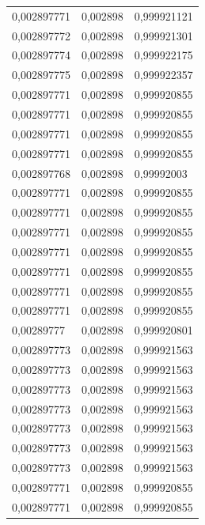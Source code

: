\begin{center}
\begin{longtable}{|l|l|l|}
0,002897771        & 0,002898              & 0,999921121  \\
0,002897772        & 0,002898              & 0,999921301  \\
0,002897774        & 0,002898              & 0,999922175  \\
0,002897775        & 0,002898              & 0,999922357  \\
0,002897771        & 0,002898              & 0,999920855  \\
0,002897771        & 0,002898              & 0,999920855  \\
0,002897771        & 0,002898              & 0,999920855  \\
0,002897771        & 0,002898              & 0,999920855  \\
0,002897768        & 0,002898              & 0,99992003   \\
0,002897771        & 0,002898              & 0,999920855  \\
0,002897771        & 0,002898              & 0,999920855  \\
0,002897771        & 0,002898              & 0,999920855  \\
0,002897771        & 0,002898              & 0,999920855  \\
0,002897771        & 0,002898              & 0,999920855  \\
0,002897771        & 0,002898              & 0,999920855  \\
0,002897771        & 0,002898              & 0,999920855  \\
0,00289777         & 0,002898              & 0,999920801  \\
0,002897773        & 0,002898              & 0,999921563  \\
0,002897773        & 0,002898              & 0,999921563  \\
0,002897773        & 0,002898              & 0,999921563  \\
0,002897773        & 0,002898              & 0,999921563  \\
0,002897773        & 0,002898              & 0,999921563  \\
0,002897773        & 0,002898              & 0,999921563  \\
0,002897773        & 0,002898              & 0,999921563  \\
0,002897771        & 0,002898              & 0,999920855  \\
0,002897771        & 0,002898              & 0,999920855  \\

\end{longtable}
\end{center}
